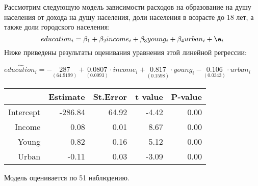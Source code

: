 \documentclass[pdftex,11pt,openany]{book}\usepackage[]{graphicx}\usepackage[]{color}
\begin{document}
\begin{solution}
\end{solution}




\begin{problem} %
 Рассмотрим следующую модель зависимости расходов на образование на душу населения от дохода на душу населения, доли населения в возрасте до 18 лет, а также доли городского населения: 
\[
education_i = \beta_1 + \beta_2 income_i + \beta_3 young_i + \beta_4 urban_i + \e_i
\]
Ниже приведены результаты оценивания уравнения этой линейной регрессии:
\begin{center}
\ensuremath{\widehat{education}_i=-\underset{(64.9199)}{287}+\underset{( 0.0093)}{0.0807}\cdot income_i+\underset{( 0.1598)}{0.817}\cdot young_i-\underset{( 0.0343)}{0.106}\cdot urban_i}%
\begin{table}[ht]
\centering
\begin{tabular}{rrrrr}
  \hline
 & Estimate & St.Error & t value & P-value \\ 
  \hline
Intercept & -286.84 & 64.92 & -4.42 & 0.00 \\ 
  Income & 0.08 & 0.01 & 8.67 & 0.00 \\ 
  Young & 0.82 & 0.16 & 5.12 & 0.00 \\ 
  Urban & -0.11 & 0.03 & -3.09 & 0.00 \\ 
   \hline
\end{tabular}
\end{table}

\end{center}

Модель оценивается по 51 наблюдению.


\end{problem}
\end{document}
